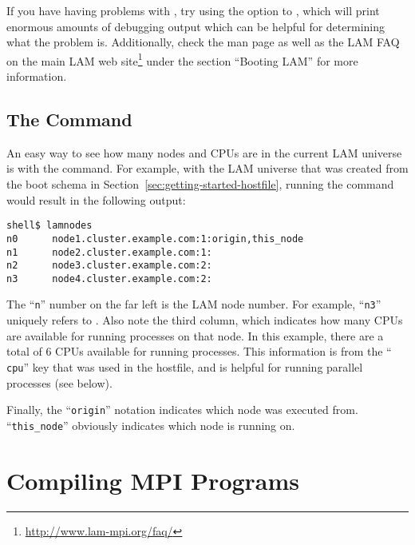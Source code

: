 If you have having problems with , try using the
 option to , which will print enormous amounts
of debugging output which can be helpful for determining what the
problem is.  Additionally, check the  man page as
well as the LAM FAQ on the main LAM web
site\footnote{\url{http://www.lam-mpi.org/faq/}} under the section
``Booting LAM'' for more information.


\subsection{The  Command}

An easy way to see how many nodes and CPUs are in the current LAM
universe is with the  command.  For example, with the
LAM universe that was created from the boot schema in
Section~\ref{sec:getting-started-hostfile}, running the 
command would result in the following output:

\lstset{style=lam-cmdline}
\begin{lstlisting}
shell$ lamnodes
n0      node1.cluster.example.com:1:origin,this_node
n1      node2.cluster.example.com:1:
n2      node3.cluster.example.com:2:
n3      node4.cluster.example.com:2:
\end{lstlisting}

The ``{\tt n}'' number on the far left is the LAM node number.  For
example, ``{\tt n3}'' uniquely refers to .  Also note the
third column, which indicates how many CPUs are available for running
processes on that node.  In this example, there are a total of 6 CPUs
available for running processes.  This information is from the ``{\tt
  cpu}'' key that was used in the hostfile, and is helpful for running
parallel processes (see below).

Finally, the ``{\tt origin}'' notation indicates which node
 was executed from.  ``{\tt this\_\-node}'' obviously
indicates which node  is running on.


\section{Compiling MPI Programs}
\label{sec:getting-started-compiling}

